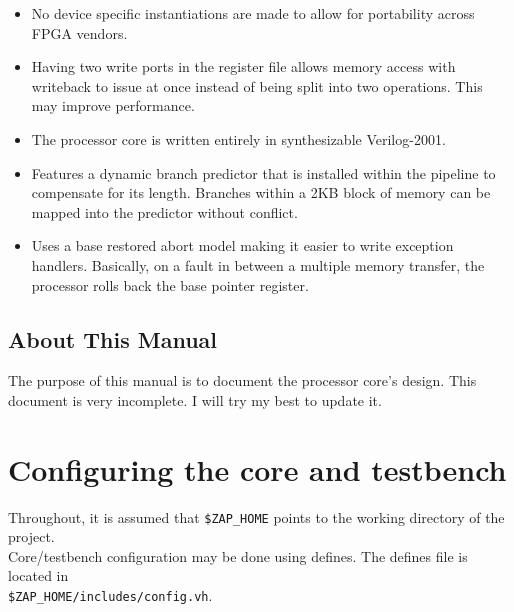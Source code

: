 \documentclass[11pt]{article}
\begin{document}
\begin{itemize}
\item No device specific instantiations are made to allow for portability
across FPGA vendors.

\item Having two write ports in the register file allows memory access with
writeback to issue at once instead of being split into two operations. This
may improve performance.

\item The processor core is written entirely in synthesizable Verilog-2001.

\item Features a dynamic branch predictor that is installed within the
pipeline to compensate for its length. Branches within a 2KB block of memory 
can be mapped into the predictor without conflict.

\item Uses a base restored abort model making it easier to write exception
handlers. Basically, on a fault in between a multiple memory transfer, the
processor rolls back the base pointer register.

\end{itemize}

\pagebreak


\subsection{About This Manual}
The purpose of this manual is to document the processor core's design. This
document is very incomplete. I will try my best to update it.

\pagebreak


\section{Configuring the core and testbench}
Throughout, it is assumed that \texttt{\$ZAP\_HOME} points to the working
directory of the project.\\
Core/testbench configuration may be done using defines. The defines file is 
located in \\
\texttt{\$ZAP\_HOME/includes/config.vh}. \\
\end{document}
